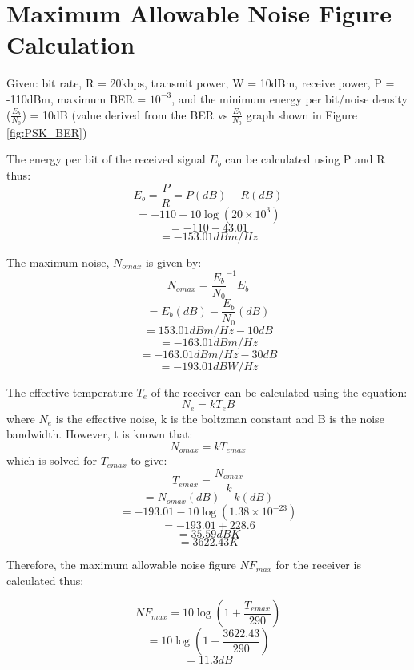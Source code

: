 
\section{Maximum Allowable Noise Figure Calculation}
Given: bit rate, R = 20kbps,
transmit power, W = 10dBm,
receive power, P = -110dBm,
maximum BER = \(10^{-3}\), and the 
minimum energy per bit/noise density (\(\frac{E_{b}}{N_{0}}\)) = 10dB (value derived from the BER vs \(\frac{E_{b}}{N_{0}}\) graph shown in Figure \ref{fig:PSK_BER})


The energy per bit of the received signal \(E_{b}\) can be calculated using P and R thus:
		\[ E_{b} = \frac{P}{R} = P(dB) - R(dB) \]
		\[       = -110 - 10 \log \left( 20 \times 10^{3} \right) \]
		\[       = -110 - 43.01 \]
		\[       = -153.01dBm/Hz\]
		
The maximum noise, \(N_{omax}\) is given by:
		\[ N_{omax} = \frac{E_{b}}{N_{0}}^{-1} E_{b}  \]
		\[			= E_{b}(dB) - \frac{E_{b}}{N_{0}} (dB) \]
		\[			= 153.01dBm/Hz - 10dB \]
		\[			= -163.01dBm/Hz \]
		\[			= -163.01dBm/Hz -30dB \]
		\[			= -193.01dBW/Hz\]

The effective temperature \(T_{e}\) of the receiver can be calculated using the equation:
		\[
			N_{e} = kT_{e}B
		\]
where \(N_{e}\) is the effective noise, k is the boltzman constant and B is the noise bandwidth.
However, t is known that:
		\[ N_{omax} = kT_{emax}\]
which is solved for \(T_{emax}\) to give:
		\[
			T_{emax} = \frac{N_{omax}}{k} \]
		\[			 = N_{omax}(dB) - k (dB) \]
		\[			 = -193.01 - 10 \log \left( 1.38 \times 10^{-23} \right) \]
		\[			 = -193.01 + 228.6 \]
		\[			 = 35.59dBK \]
		\[			 = 3622.43K \]
		
Therefore, the maximum allowable noise figure \(NF_{max}\) for the receiver is calculated thus:
		
		\[	NF_{max} = 10 \log \left(1 + \frac{T_{emax}}{290} \right) \]
		\[			 = 10 \log \left(1 + \frac{3622.43}{290} \right) \]
		\[			 = 11.3dB	\]


